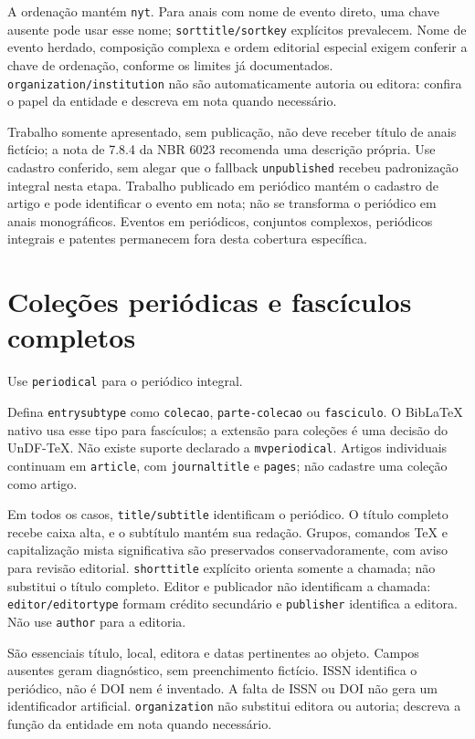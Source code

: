A ordenação mantém \texttt{nyt}. Para anais com nome de evento direto, uma
chave ausente pode usar esse nome; \texttt{sorttitle/sortkey} explícitos prevalecem.
Nome de evento herdado, composição complexa e ordem editorial especial exigem
conferir a chave de ordenação, conforme os limites já documentados.
\texttt{organization/institution} não são automaticamente autoria ou editora:
confira o papel da entidade e descreva em nota quando necessário.

Trabalho somente apresentado, sem publicação, não deve receber título de anais
fictício; a nota de 7.8.4 da NBR 6023 recomenda uma descrição própria. Use cadastro
conferido, sem alegar que o fallback \texttt{unpublished} recebeu padronização
integral nesta etapa. Trabalho publicado em periódico mantém o cadastro de
artigo e pode identificar o evento em nota; não se transforma o periódico em
anais monográficos. Eventos em periódicos, conjuntos complexos, periódicos
integrais e patentes permanecem fora desta cobertura específica.

\section{Coleções periódicas e fascículos completos}

Use \texttt{periodical} para o periódico integral.

Defina \texttt{entrysubtype} como \texttt{colecao}, \texttt{parte-colecao} ou
\texttt{fasciculo}.
O BibLaTeX nativo usa esse tipo para fascículos; a extensão para coleções é
uma decisão do UnDF-TeX. Não existe suporte declarado a \texttt{mvperiodical}.
Artigos individuais continuam em \texttt{article}, com \texttt{journaltitle} e
\texttt{pages}; não cadastre uma coleção como artigo.

Em todos os casos, \texttt{title/subtitle} identificam o periódico. O título
completo recebe caixa alta, e o subtítulo mantém sua redação. Grupos, comandos
TeX e capitalização mista significativa são preservados conservadoramente,
com aviso para revisão editorial. \texttt{shorttitle} explícito orienta somente
a chamada; não substitui o título completo. Editor e publicador não identificam
a chamada: \texttt{editor/editortype} formam crédito secundário e
\texttt{publisher} identifica a editora. Não use \texttt{author} para a editoria.

São essenciais título, local, editora e datas pertinentes ao objeto. Campos
ausentes geram diagnóstico, sem preenchimento fictício. ISSN identifica o
periódico, não é DOI nem é inventado. A falta de ISSN ou DOI não gera um
identificador artificial. \texttt{organization} não substitui editora ou autoria;
descreva a função da entidade em nota quando necessário.

